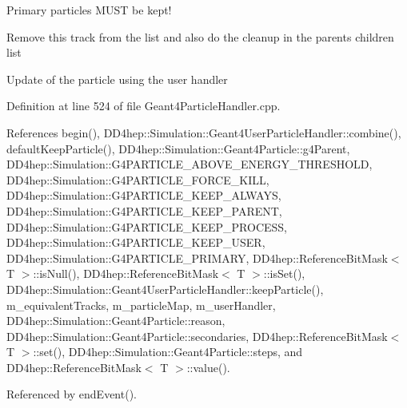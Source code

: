 Primary particles M\+U\+ST be kept!

Remove this track from the list and also do the cleanup in the parent\textquotesingle{}s children list

Update of the particle using the user handler 

Definition at line 524 of file Geant4\+Particle\+Handler.\+cpp.



References begin(), D\+D4hep\+::\+Simulation\+::\+Geant4\+User\+Particle\+Handler\+::combine(), default\+Keep\+Particle(), D\+D4hep\+::\+Simulation\+::\+Geant4\+Particle\+::g4\+Parent, D\+D4hep\+::\+Simulation\+::\+G4\+P\+A\+R\+T\+I\+C\+L\+E\+\_\+\+A\+B\+O\+V\+E\+\_\+\+E\+N\+E\+R\+G\+Y\+\_\+\+T\+H\+R\+E\+S\+H\+O\+LD, D\+D4hep\+::\+Simulation\+::\+G4\+P\+A\+R\+T\+I\+C\+L\+E\+\_\+\+F\+O\+R\+C\+E\+\_\+\+K\+I\+LL, D\+D4hep\+::\+Simulation\+::\+G4\+P\+A\+R\+T\+I\+C\+L\+E\+\_\+\+K\+E\+E\+P\+\_\+\+A\+L\+W\+A\+YS, D\+D4hep\+::\+Simulation\+::\+G4\+P\+A\+R\+T\+I\+C\+L\+E\+\_\+\+K\+E\+E\+P\+\_\+\+P\+A\+R\+E\+NT, D\+D4hep\+::\+Simulation\+::\+G4\+P\+A\+R\+T\+I\+C\+L\+E\+\_\+\+K\+E\+E\+P\+\_\+\+P\+R\+O\+C\+E\+SS, D\+D4hep\+::\+Simulation\+::\+G4\+P\+A\+R\+T\+I\+C\+L\+E\+\_\+\+K\+E\+E\+P\+\_\+\+U\+S\+ER, D\+D4hep\+::\+Simulation\+::\+G4\+P\+A\+R\+T\+I\+C\+L\+E\+\_\+\+P\+R\+I\+M\+A\+RY, D\+D4hep\+::\+Reference\+Bit\+Mask$<$ T $>$\+::is\+Null(), D\+D4hep\+::\+Reference\+Bit\+Mask$<$ T $>$\+::is\+Set(), D\+D4hep\+::\+Simulation\+::\+Geant4\+User\+Particle\+Handler\+::keep\+Particle(), m\+\_\+equivalent\+Tracks, m\+\_\+particle\+Map, m\+\_\+user\+Handler, D\+D4hep\+::\+Simulation\+::\+Geant4\+Particle\+::reason, D\+D4hep\+::\+Simulation\+::\+Geant4\+Particle\+::secondaries, D\+D4hep\+::\+Reference\+Bit\+Mask$<$ T $>$\+::set(), D\+D4hep\+::\+Simulation\+::\+Geant4\+Particle\+::steps, and D\+D4hep\+::\+Reference\+Bit\+Mask$<$ T $>$\+::value().



Referenced by end\+Event().

\hypertarget{class_d_d4hep_1_1_simulation_1_1_geant4_particle_handler_a1e75f073fa789609d31025fa7af977e8}{}\label{class_d_d4hep_1_1_simulation_1_1_geant4_particle_handler_a1e75f073fa789609d31025fa7af977e8} 
